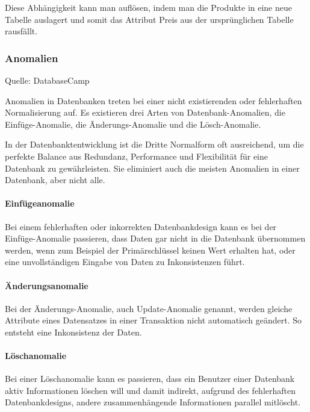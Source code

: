 Diese Abhängigkeit kann man auflösen, indem man die Produkte in eine neue Tabelle auslagert und somit das Attribut Preis aus der ursprünglichen Tabelle rausfällt.

\subsubsection{Anomalien}
\label{sec:Anomalien}

Quelle: DatabaseCamp \cite{anomalien}

Anomalien in Datenbanken treten bei einer nicht existierenden oder fehlerhaften Normalisierung auf.
Es existieren drei Arten von Datenbank-Anomalien, die Einfüge-Anomalie, die Änderungs-Anomalie und die Lösch-Anomalie.

In der Datenbanktentwicklung ist die Dritte Normalform oft ausreichend, um die perfekte Balance aus Redundanz, Performance und Flexibilität für eine Datenbank zu gewährleisten. Sie eliminiert auch die meisten Anomalien in einer Datenbank, aber nicht alle.

\paragraph{Einfügeanomalie} Bei einem fehlerhaften oder inkorrekten Datenbankdesign kann es bei der Einfüge-Anomalie passieren, dass Daten gar nicht in die Datenbank übernommen werden, wenn zum Beispiel der Primärschlüssel keinen Wert erhalten hat, oder eine unvollständigen Eingabe von Daten zu Inkonsistenzen führt.

\paragraph{Änderungsanomalie} Bei der Änderungs-Anomalie, auch Update-Anomalie genannt, werden gleiche Attribute eines Datensatzes in einer Transaktion nicht automatisch geändert. So entsteht eine Inkonsistenz der Daten.

\paragraph{Löschanomalie} Bei einer Löschanomalie kann es passieren, dass ein Benutzer einer Datenbank aktiv Informationen löschen will und damit indirekt, aufgrund des fehlerhaften Datenbankdesigns, andere zusammenhängende Informationen parallel mitlöscht.